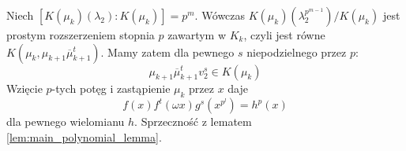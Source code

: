 Niech $\left[K\left(\mu_k\right)\left(\lambda_2\right) :
K\left(\mu_k\right)\right] = p^m$.
Wówczas 
$K\left(\mu_k\right)\left(\lambda_2^{p^{m-1}}\right)/K\left(\mu_k\right)$ jest
prostym rozszerzeniem stopnia $p$ zawartym w $K_k$, czyli jest równe 
$K \left( \mu_k, \mu_{k+1} \overline{\mu}_{k+1}^t \right)$.
Mamy zatem dla pewnego $s$ niepodzielnego przez $p$:
\[\mu_{k+1} \overline{\mu}_{k+1}^tv_2^s \in K\left(\mu_k\right)\]
Wzięcie $p$-tych potęg i zastąpienie $\mu_k$ przez $x$ daje
\[f(x)f^t(\omega x)g^s\left(x^{p^l}\right) = h^p(x)\]
dla pewnego wielomianu $h$. Sprzeczność z lematem
\ref{lem:main_polynomial_lemma}.
